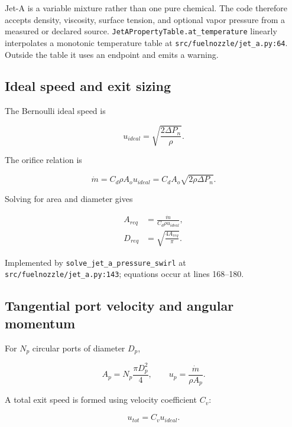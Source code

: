 \documentclass[11pt]{article}
\newcommand{\code}[1]{\nolinkurl{#1}}
\newcommand{\srcline}[2]{\nolinkurl{#1:#2}}
\begin{document}
Jet-A is a variable mixture rather than one pure chemical. The code therefore accepts
density, viscosity, surface tension, and optional vapor pressure from a measured or
declared source. \code{JetAPropertyTable.at_temperature} linearly interpolates a
monotonic temperature table at \srcline{src/fuelnozzle/jet_a.py}{64}. Outside the
table it uses an endpoint and emits a warning.

\subsection{Ideal speed and exit sizing}

The Bernoulli ideal speed is

\begin{equation}
  u_{ideal}=\sqrt{\frac{2\Delta P_n}{\rho}}.
  \label{eq:jet-ideal-velocity}
\end{equation}

The orifice relation is

\begin{equation}
  \dot m=C_d\rho A_o u_{ideal}
  =C_d A_o\sqrt{2\rho\Delta P_n}.
  \label{eq:jet-orifice-flow}
\end{equation}

Solving for area and diameter gives

\begin{align}
  A_{req}&=\frac{\dot m}{C_d\rho u_{ideal}}, \\
  D_{req}&=\sqrt{\frac{4A_{req}}{\pi}}.
  \label{eq:jet-sizing}
\end{align}

Implemented by \code{solve_jet_a_pressure_swirl} at
\srcline{src/fuelnozzle/jet_a.py}{143}; equations occur at lines 168--180.

\subsection{Tangential port velocity and angular momentum}

For $N_p$ circular ports of diameter $D_p$,

\begin{equation}
  A_p=N_p\frac{\pi D_p^2}{4}, \qquad
  u_p=\frac{\dot m}{\rho A_p}.
  \label{eq:port-flow}
\end{equation}

A total exit speed is formed using velocity coefficient $C_v$:

\begin{equation}
  u_{tot}=C_v u_{ideal}.
  \label{eq:total-exit-speed}
\end{equation}
\end{document}
